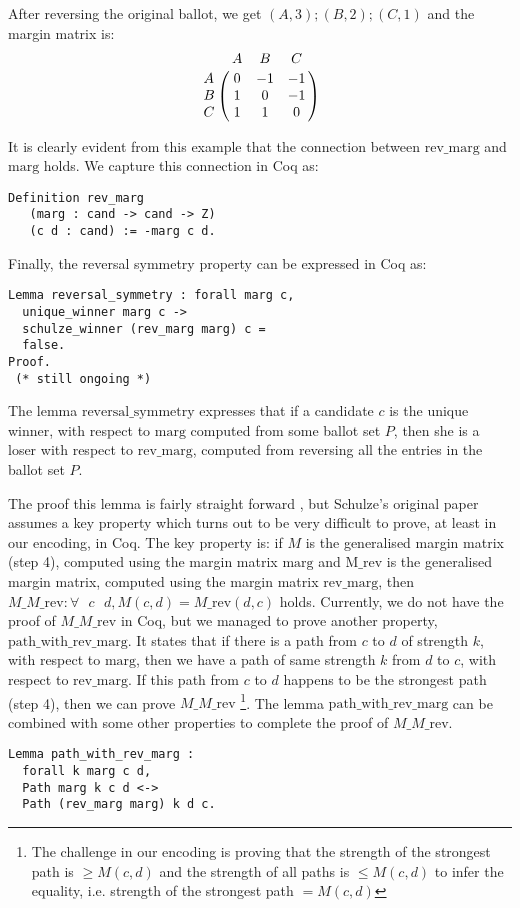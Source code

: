 \documentclass[compsoc,conference,a4paper,10pt,times]{IEEEtran}
\begin{document}
\noindent      
After reversing the original ballot, we get $(A, 3); (B, 2); (C, 1)$ and 
the margin matrix is:
\[
\bordermatrix{ & A & B & C \cr
      A & 0 & -1 & -1 \cr
      B & 1 & 0 & -1 \cr
      C & 1 & 1 & 0 }
      \]


\noindent
It is clearly evident from this example that the 
connection between $\mathrm{rev\_marg}$ and $\mathrm{marg}$  holds.
We capture this connection in Coq as:

\begin{verbatim}
Definition rev_marg 
   (marg : cand -> cand -> Z) 
   (c d : cand) := -marg c d.
\end{verbatim}

\noindent


Finally, the reversal symmetry property can be expressed in Coq as: 
\begin{verbatim}
Lemma reversal_symmetry : forall marg c, 
  unique_winner marg c ->
  schulze_winner (rev_marg marg) c = 
  false.
Proof. 
 (* still ongoing *)
\end{verbatim}

\noindent
The lemma $\mathrm{reversal\_symmetry}$ expresses that if a candidate $c$ is the unique 
winner, with respect to $\mathrm{marg}$ computed from some ballot set $P$, then she is 
a loser with respect to $\mathrm{rev\_marg}$, computed from reversing all the entries 
in the ballot set $P$.

\noindent
The proof this lemma is fairly straight forward \cite{Schulze:2011:NMC}, but 
Schulze's original paper assumes a key property which turns out to be very difficult to prove, 
at least in our encoding, in Coq. The key property is: if $M$ 
is the generalised margin 
matrix (step 4), computed using the margin matrix $\mathrm{marg}$
and $\mathrm{M\_rev}$ is the generalised 
margin matrix, computed using the margin matrix $\mathrm{rev\_marg}$, then 
$M\_M\_\mathrm{rev}: \forall \text{ } c \text{ } d,  M(c, d) =
M\_\mathrm{rev} (d, c)$ holds. Currently, 
we do not have the proof of $M\_M\_\mathrm{rev}$ in Coq, but we managed to prove 
another property, $\mathrm{path\_with\_rev\_marg}$.  
It states that if there is a path from 
$c$ to $d$ of strength $k$, with respect to $\mathrm{marg}$, then we have 
a path of same strength $k$ from $d$ to $c$, with respect to
$\mathrm{rev\_marg}$. 
If this path from $c$ to $d$ happens to be the strongest path (step 4), 
then we can prove $M\_M\_\mathrm{rev}$ \footnote{The challenge in our encoding 
is proving that the strength of the strongest path is $\geq  M(c, d)$ and 
the strength of all paths is $\leq M(c, d)$ to infer the equality, 
i.e. strength of the strongest path $= M(c, d)$}.  The lemma $\mathrm{path\_with\_rev\_marg}$ can be 
combined with 
some other properties to complete the proof of $M\_M\_\mathrm{rev}$. 

\begin{verbatim}
Lemma path_with_rev_marg :
  forall k marg c d,
  Path marg k c d <->  
  Path (rev_marg marg) k d c.

\end{verbatim}








\end{document}
